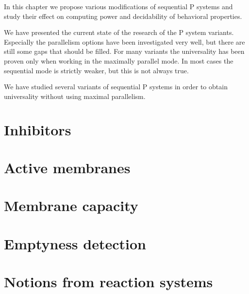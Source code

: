 In this chapter we propose various modifications of sequential P systems and study their effect on computing power and decidability of behavioral properties.

We have presented the current state of the research of the P system variants. Especially the parallelism options have been investigated very well, but there are still some gaps that should be filled. For many variants the universality has been proven only when working in the maximally parallel mode. In most cases the sequential mode is strictly weaker, but this is not always true.

We have studied several variants of sequential P systems in order to obtain universality without using maximal parallelism.

\section{Inhibitors} %
\label{sec:inhibitors}


\section{Active membranes} %
\label{sec:active_membranes}


\section{Membrane capacity} %
\label{sec:membrane_capacity}


\section{Emptyness detection} %
\label{sec:emptyness_detection}


\section{Notions from reaction systems} %
\label{sec:notions_from_reaction_systems}

